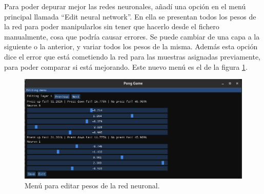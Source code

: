 Para poder depurar mejor las redes neuronales, añadí una opción en el menú principal llamada ``Edit neural network''. En ella se presentan todos los pesos de la red para poder manipularlos sin tener que hacerlo desde el fichero manualmente, cosa que podría causar errores. Se puede cambiar de una capa a la siguiente o la anterior, y variar todos los pesos de la misma. Además esta opción dice el error que está cometiendo la red para las muestras asignadas previamente, para poder comparar si está mejorando. Este nuevo menú es el de la figura \ref{editar red neuronal}.

\begin{figure}[H]
	\centering
	\includegraphics[width=15cm]{archivos/imagenes/menu-editar-pesos-red.png}
	\caption{Menú para editar pesos de la red neuronal.}
	\label{editar red neuronal}
\end{figure}
